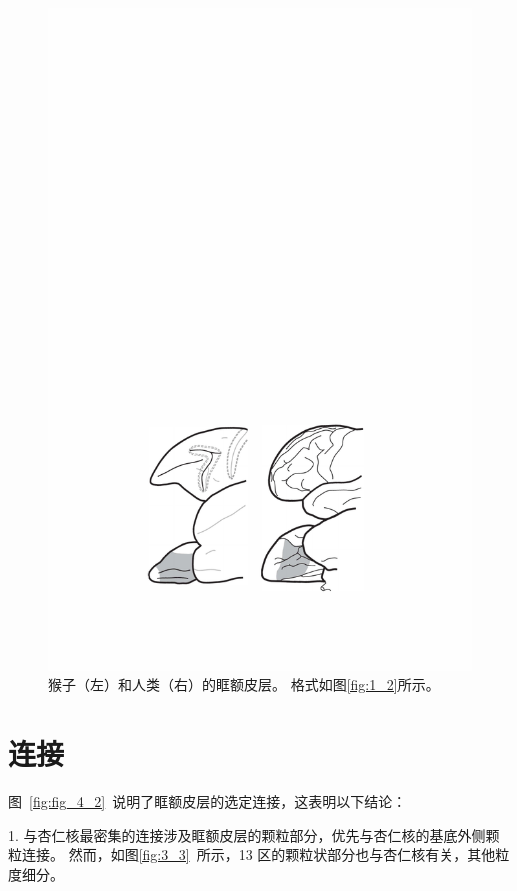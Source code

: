 \begin{figure}[!htb]
	\centering
	\includegraphics{chap4/fig_4_1}
	\caption{猴子（左）和人类（右）的眶额皮层。
		格式如图\ref{fig:1_2}所示。}\label{fig:fig_4_1}
\end{figure}



\section{连接}

图~\ref{fig:fig_4_2}~说明了眶额皮层的选定连接，这表明以下结论：\par


1. 与杏仁核最密集的连接涉及眶额皮层的颗粒部分，优先与杏仁核的基底外侧颗粒连接。
然而，如图\ref{fig:3_3}~所示，13 区的颗粒状部分也与杏仁核有关，其他粒度细分\cite{carmichael1995limbic}。\par


